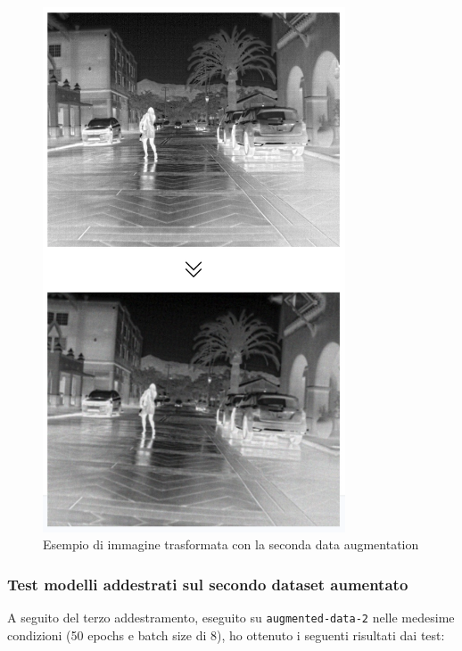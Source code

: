 \begin{figure}[ht]
    \centering
    \includegraphics[width=0.8\textwidth]{files/capitoli/4-sperimentazione-risultati/assets/augmented-data-2-example.png}
    \caption{\label{fig:augmented-data-2-example}Esempio di immagine trasformata con la seconda data augmentation}
\end{figure}

\clearpage

\subsubsection{Test modelli addestrati sul secondo dataset aumentato}
A seguito del terzo addestramento, eseguito su \texttt{augmented-data-2} nelle medesime condizioni (50 epochs e batch size di 8), ho ottenuto i seguenti risultati dai test:

